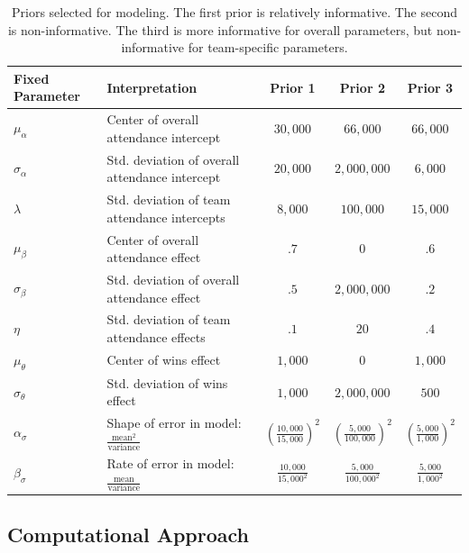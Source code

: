 \documentclass[11pt]{article}
\begin{document}
\begin{table}[ht]
    \centering
    \footnotesize
    \begin{tabular}{llccc}
         Fixed  Parameter & Interpretation & Prior 1 & Prior 2 & Prior 3 \\
         \hline
         $\mu_\alpha$ & Center of overall attendance intercept & $30{,}000$ &  $66{,}000$ & $66{,}000$ \\
         $\sigma_\alpha$ & Std. deviation of overall attendance intercept & $20{,}000$ &  $2{,}000{,}000$ & $6{,}000$ \\
         $\lambda$ & Std. deviation of team attendance intercepts & $8{,}000$ &  $100{,}000$ & $15{,}000$ \\
         $\mu_\beta$ & Center of overall attendance effect & $.7$ &  $0$ & $.6$ \\
         $\sigma_\beta$ & Std. deviation of overall attendance effect & $.5$ &  $2{,}000{,}000$ & $.2$ \\
         $\eta$ & Std. deviation of team attendance effects & $.1$ &  $20$ & $.4$ \\
         $\mu_\theta$ & Center of wins effect & $1{,}000$ &  $0$ & $1{,}000$ \\
         $\sigma_\theta$ & Std. deviation of wins effect & $1{,}000$ &  $2{,}000{,}000$ & $500$ \\
         $\alpha_\sigma$ & Shape of error in model: $\frac{\text{mean}^2}{\text{variance}}$ & $\left(\frac{10{,}000}{15{,}000}\right)^2$ &  $\left(\frac{5{,}000}{100{,}000}\right)^2$ & $\left(\frac{5{,}000}{1{,}000}\right)^2$ \\
         $\beta_\sigma$ & Rate of error in model: $\frac{\text{mean}}{\text{variance}}$ & $\frac{10{,}000}{15{,}000^2}$ &  $\frac{5{,}000}{100{,}000^2}$ & $\frac{5{,}000}{1{,}000^2}$ \\
         \hline
    \end{tabular}
    \caption{\footnotesize Priors selected for modeling. The first prior is relatively informative. The second is non-informative. The third is more informative for overall parameters, but non-informative for team-specific parameters. \vspace*{-.5\baselineskip}}
    \label{tab:priors}
\end{table}

\vspace*{-.5\baselineskip}
\subsection{Computational Approach}
\end{document}
